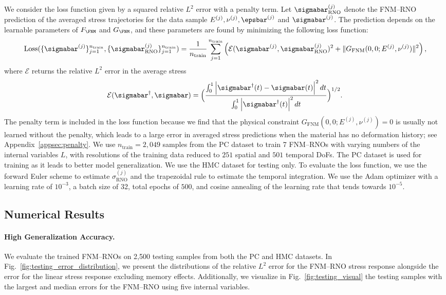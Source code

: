 \documentclass[letterpaper,11pt]{article}
\begin{document}
We consider the loss function given by a squared relative $L^2$ error with a penalty term. Let $\sigmabar^{(j)}_{\text{RNO}}$ denote the FNM--RNO prediction of the averaged stress trajectories for the data sample $E^{(j)}, \nu^{(j)}, \epsbar^{(j)}$ and $\sigmabar^{(j)}$. The prediction depends on the learnable parameters of $F_{\FNM}$ and $G_{\FNM}$, and these parameters are found by minimizing the following loss function:
\begin{equation}\label{eq:loss_function}
    \text{Loss}(\{\sigmabar^{(j)}\}_{j=1}^{n_\text{train}}, \{\sigmabar^{(j)}_{\text{RNO}}\}_{j=1}^{n_\text{train}}) = \frac{1}{n_{\text{train}}}\sum_{j=1}^{n_\text{train}}\left(
    \mathcal{E}(\sigmabar^{(j)}, \sigmabar^{(j)}_{\text{RNO}})^2 + \| G_{\text{FNM}}(0,0;E^{(j)},\nu^{(j)})\|^2\right),
\end{equation}
where $\mathcal{E}$ returns the relative $L^2$ error in the average stress
\begin{equation}
     \mathcal{E}(\sigmabar^{\dagger}, \sigmabar) = \Big(\frac{\int_{0}^{1}\left|\sigmabar^{\dagger}(t)- \sigmabar(t) \right|^2dt}{\int_{0}^ {1}\left|\sigmabar^{\dagger}(t) \right|^2dt}\Big)^{1/2}.
\end{equation}
The penalty term is included in the loss function because we find that the physical constraint $G_{\text{FNM}}(0,0;E^{(j)},\nu^{(j)}) = 0$ is usually not learned without the penalty, which leads to a large error in averaged stress predictions when the material has no deformation history; see Appendix~\ref{appsec:penalty}. We use $n_{\text{train}}=2,049$ samples from the PC dataset to train 7 FNM--RNOs with varying numbers of the internal variables $L$, with resolutions of the training data reduced to $251$ spatial and $501$ temporal DoFs. The PC dataset is used for training as it leads to better model generalization. We use the HMC dataset for testing only. To evaluate the loss function, we use the forward Euler scheme to estimate $\sigma^{(j)}_{\text{RNO}}$ and the trapezoidal rule to estimate the temporal integration. We use the Adam optimizer with a learning rate of $10^{-3}$, a batch size of 32, total epochs of $500$, and cosine annealing of the learning rate that tends towards $10^{-5}$.


\subsection{Numerical Results}\label{subsec:numerical}

\paragraph{High Generalization Accuracy.} We evaluate the trained FNM--RNOs on 2,500 testing samples from both the PC and HMC datasets. In Fig.~\ref{fig:testing_error_distribution}, we present the distributions of the relative $L^2$ error for the FNM--RNO stress response alongside the error for the linear stress response excluding memory effects. Additionally, we visualize in Fig.~\ref{fig:testing_visual} the testing samples with the largest and median errors for the FNM--RNO using five internal variables. 
\end{document}
